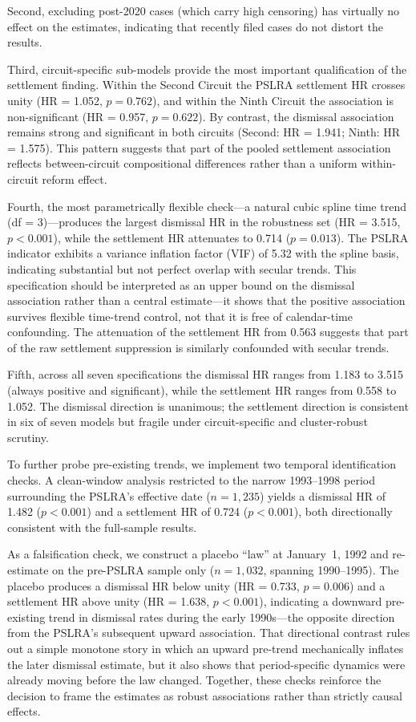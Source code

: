 Second, excluding post-2020 cases (which carry high censoring) has virtually no effect on the estimates, indicating that recently filed cases do not distort the results.

Third, circuit-specific sub-models provide the most important qualification of the settlement finding. Within the Second Circuit the PSLRA settlement HR crosses unity (HR = 1.052, $p = 0.762$), and within the Ninth Circuit the association is non-significant (HR = 0.957, $p = 0.622$). By contrast, the dismissal association remains strong and significant in both circuits (Second: HR = 1.941; Ninth: HR = 1.575). This pattern suggests that part of the pooled settlement association reflects between-circuit compositional differences rather than a uniform within-circuit reform effect.

Fourth, the most parametrically flexible check—a natural cubic spline time trend (df = 3)—produces the largest dismissal HR in the robustness set (HR = 3.515, $p < 0.001$), while the settlement HR attenuates to 0.714 ($p = 0.013$). The PSLRA indicator exhibits a variance inflation factor (VIF) of 5.32 with the spline basis, indicating substantial but not perfect overlap with secular trends. This specification should be interpreted as an upper bound on the dismissal association rather than a central estimate---it shows that the positive association survives flexible time-trend control, not that it is free of calendar-time confounding. The attenuation of the settlement HR from 0.563 suggests that part of the raw settlement suppression is similarly confounded with secular trends.

Fifth, across all seven specifications the dismissal HR ranges from 1.183 to 3.515 (always positive and significant), while the settlement HR ranges from 0.558 to 1.052. The dismissal direction is unanimous; the settlement direction is consistent in six of seven models but fragile under circuit-specific and cluster-robust scrutiny.

To further probe pre-existing trends, we implement two temporal identification checks. A clean-window analysis restricted to the narrow 1993--1998 period surrounding the PSLRA’s effective date ($n = 1{,}235$) yields a dismissal HR of 1.482 ($p < 0.001$) and a settlement HR of 0.724 ($p < 0.001$), both directionally consistent with the full-sample results. 

As a falsification check, we construct a placebo ``law'' at January~1, 1992 and re-estimate on the pre-PSLRA sample only ($n = 1{,}032$, spanning 1990--1995). The placebo produces a dismissal HR below unity (HR = 0.733, $p = 0.006$) and a settlement HR above unity (HR = 1.638, $p < 0.001$), indicating a downward pre-existing trend in dismissal rates during the early 1990s---the opposite direction from
the PSLRA's subsequent upward association. That directional
contrast rules out a simple monotone story in which an
upward pre-trend mechanically inflates the later dismissal
estimate, but it also shows that period-specific dynamics
were already moving before the law changed. Together, these checks reinforce the decision to frame the estimates as robust associations rather than strictly causal effects.

